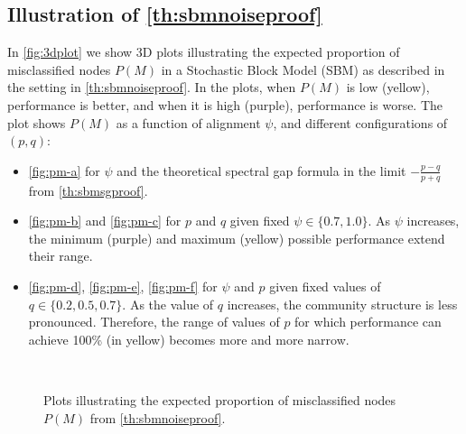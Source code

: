 \subsection{Illustration of \autoref{th:sbmnoiseproof}}\label{app:3dplot}
In \autoref{fig:3dplot} we show 3D plots illustrating the expected proportion of misclassified nodes $P(M)$ in a Stochastic Block Model (SBM) as described in the setting in \autoref{th:sbmnoiseproof}. In the plots, when $P(M)$ is low (yellow), performance is better, and when it is high (purple), performance is worse. The plot shows $P(M)$ as a function of alignment $\psi$, and different configurations of $(p,q)$: \begin{itemize}
    \item \ref{fig:pm-a} for $\psi$ and the theoretical spectral gap formula in the limit $-\frac{p-q}{p+q}$ from \autoref{th:sbmsgproof}.
    \item \ref{fig:pm-b} and \ref{fig:pm-c} for $p$ and $q$ given fixed $\psi\in\{0.7,1.0\}$. As $\psi$ increases, the minimum (purple) and maximum (yellow) possible performance extend their range.
    \item \ref{fig:pm-d}, \ref{fig:pm-e}, \ref{fig:pm-f} for $\psi$ and $p$ given fixed values of $q\in\{0.2,0.5,0.7\}$. As the value of $q$ increases, the community structure is less pronounced. Therefore, the range of values of $p$ for which performance can achieve 100\% (in yellow) becomes more and more narrow.
\end{itemize}

\begin{figure}[ht]
    \centering
    \\
    \caption{Plots illustrating the expected proportion of misclassified nodes $P(M)$ from \autoref{th:sbmnoiseproof}.}
    \label{fig:3dplot}
\end{figure}
